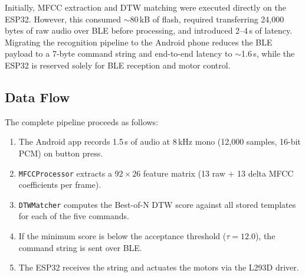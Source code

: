 \documentclass[conference]{IEEEtran}
\begin{document}
Initially, MFCC extraction and DTW matching were executed directly on
the ESP32. However, this consumed $\sim$80\,kB of flash, required
transferring 24{,}000 bytes of raw audio over BLE before processing,
and introduced 2--4\,s of latency. Migrating the recognition pipeline
to the Android phone reduces the BLE payload to a 7-byte command
string and end-to-end latency to $\sim$1.6\,s, while the ESP32 is
reserved solely for BLE reception and motor control.



\subsection{Data Flow}
The complete pipeline proceeds as follows:
\begin{enumerate}
  \item The Android app records 1.5\,s of audio at 8\,kHz mono
    (12{,}000 samples, 16-bit PCM) on button press.
  \item \texttt{MFCCProcessor} extracts a $92 \times 26$ feature matrix
    (13 raw + 13 delta MFCC coefficients per frame).
  \item \texttt{DTWMatcher} computes the Best-of-N DTW score against all
    stored templates for each of the five commands.
  \item If the minimum score is below the acceptance threshold
    ($\tau = 12.0$), the command string is sent over BLE.
  \item The ESP32 receives the string and actuates the motors via the
    L293D driver.
\end{enumerate}
\end{document}
